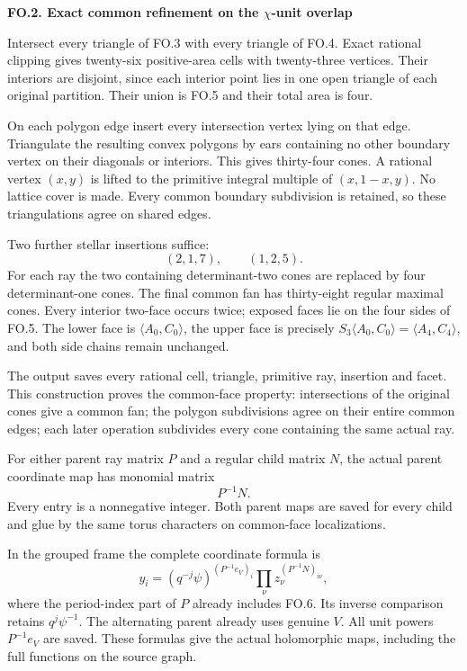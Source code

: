\par

\medskip\noindent\textbf{FO.2. Exact common refinement on the \(\chi\)-unit overlap}

\par\nobreak

Intersect every triangle of FO.3 with every triangle of
FO.4. Exact rational clipping gives twenty-six
positive-area cells with twenty-three vertices. Their
interiors are disjoint, since each interior point lies
in one open triangle of each original partition. Their
union is FO.5 and their total area is four.

On each polygon edge insert every intersection vertex
lying on that edge. Triangulate the resulting convex
polygons by ears containing no other boundary vertex
on their diagonals or interiors. This gives thirty-four
cones. A rational vertex \((x,y)\) is lifted to the
primitive integral multiple of \((x,1-x,y)\). No lattice
cover is made. Every common boundary subdivision is
retained, so these triangulations agree on shared edges.

Two further stellar insertions suffice:
\[
 (2,1,7),\qquad(1,2,5).                                   \tag{FO.9}
\]
For each ray the two containing determinant-two cones
are replaced by four determinant-one cones. The final
common fan has thirty-eight regular maximal cones.
Every interior two-face occurs twice; exposed faces
lie on the four sides of FO.5. The lower face is
\(\langle A_0,C_0\rangle\), the upper face is precisely
\(S_3\langle A_0,C_0\rangle=\langle A_4,C_4\rangle\),
and both side chains remain unchanged.

The output saves every rational cell, triangle, primitive
ray, insertion and facet. This construction proves the
common-face property: intersections of the original
cones give a common fan; the polygon subdivisions
agree on their entire common edges; each later operation
subdivides every cone containing the same actual ray.

For either parent ray matrix \(P\) and a regular child
matrix \(N\), the actual parent coordinate map has
monomial matrix
\[
 P^{-1}N.                                                  \tag{FO.10}
\]
Every entry is a nonnegative integer. Both parent maps
are saved for every child and glue by the same torus
characters on common-face localizations.

In the grouped frame the complete coordinate formula is
\[
 y_i=(q^{-j}\psi)^{(P^{-1}e_V)_i}
       \prod_\nu z_\nu^{(P^{-1}N)_{i\nu}},                 \tag{FO.11}
\]
where the period-index part of \(P\) already includes
FO.6. Its inverse comparison retains \(q^j\psi^{-1}\).
The alternating parent already uses genuine \(V\).
All unit powers \(P^{-1}e_V\) are saved. These formulas
give the actual holomorphic maps, including the full
functions on the source graph.

